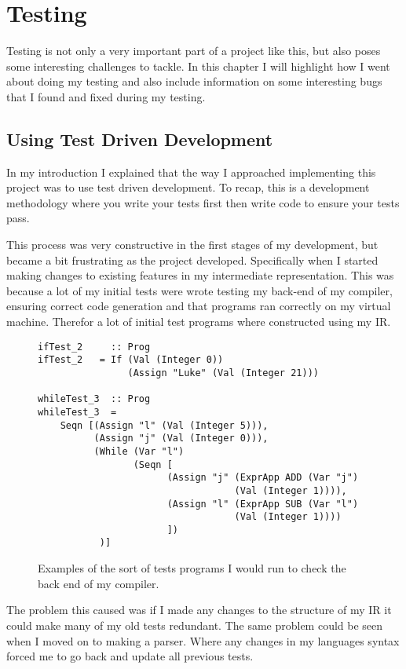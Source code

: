 
\chapter{Testing}

Testing is not only a very important part of a project like this, but also poses some interesting challenges to tackle. In this chapter I will highlight how I went about doing my testing and also include information on some interesting bugs that I found and fixed during my testing.

\section{Using Test Driven Development}

In my introduction I explained that the way I approached implementing this project was to use test driven development. To recap, this is a development methodology where you write your tests first then write code to ensure your tests pass.

This process was very constructive in the first stages of my development, but became a bit frustrating as the project developed. Specifically when I started making changes to existing features in my intermediate representation. This was because a lot of my initial tests were wrote testing my back-end of my compiler, ensuring correct code generation and that programs ran correctly on my virtual machine. Therefor a lot of initial test programs where constructed using my IR. 

\begin{figure}[h]
\centering
\begin{lstlisting}
ifTest_2     :: Prog     
ifTest_2   = If (Val (Integer 0)) 
                (Assign "Luke" (Val (Integer 21)))

whileTest_3  :: Prog      
whileTest_3  = 
    Seqn [(Assign "l" (Val (Integer 5))), 
          (Assign "j" (Val (Integer 0))), 
          (While (Var "l") 
                 (Seqn [
                       (Assign "j" (ExprApp ADD (Var "j") 
                                   (Val (Integer 1)))),
                       (Assign "l" (ExprApp SUB (Var "l") 
                                   (Val (Integer 1))))
                       ])
           )]
\end{lstlisting}
\caption{Examples of the sort of tests programs I would run to check the back end of my compiler.}
\label{fig:egEarlyTests} 
\end{figure}  

The problem this caused was if I made any changes to the structure of my IR it could make many of my old tests redundant. The same problem could be seen when I moved on to making a parser. Where any changes in my languages syntax forced me to go back and update all previous tests.

